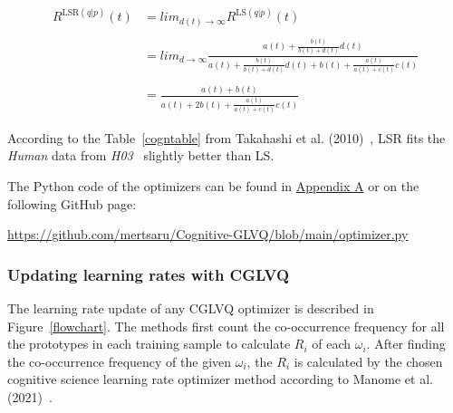 \begin{equation}
\begin{split}
R^{\text{LSR}(q|p)}(t) &= lim_{d(t) \rightarrow \infty} R^{\text{LS}(q|p)}(t)\\
\\
&= lim_{d \rightarrow \infty} \frac{a(t) + \frac{b(t)}{b(t)+d(t)} d(t)}{a(t)+ \frac{b(t)}{b(t)+d(t)} d(t) + b(t) + \frac{a(t)}{a(t)+c(t)} c(t)}\\
\\
&= \frac{a(t)+b(t)}{a(t)+2b(t)+ \frac{a(t)}{a(t)+c(t)} c(t)}
\end{split}
\end{equation}
\vspace{10pt}

According to the Table~\ref{cogntable} from Takahashi et al. (2010)~\cite{cogn}, LSR fits the \textit{Human} data from \textit{H03}~\cite{hattori03} slightly better than LS.
\vspace{10pt}

\noindent The Python code of the optimizers can be found in \hyperlink{appoptim}{Appendix A} or on the following GitHub page:

\noindent \url{https://github.com/mertsaru/Cognitive-GLVQ/blob/main/optimizer.py}

\subsubsection{Updating learning rates with CGLVQ}

The learning rate update of any CGLVQ optimizer is described in Figure~\ref{flowchart}. The methods first count the co-occurrence frequency for all the prototypes in each training sample to calculate $R_{i}$ of each $\omega_{i}$. After finding the co-occurrence frequency of the given $\omega_{i}$, the $R_{i}$ is calculated by the chosen cognitive science learning rate optimizer method according to Manome et al. (2021)~\cite{lrimp}.

